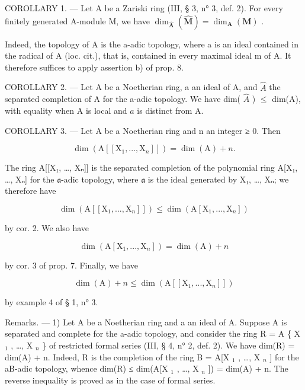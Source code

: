 COROLLARY 1. --- Let A be a Zariski ring (III, § 3, n° 3, def. 2). For every finitely generated A-module M, we have \(\dim_{\hat{\mathbf{A}}}(\hat{\mathbf{M}}) = \dim_{\mathbf{A}}(\mathbf{M})\) .

Indeed, the topology of A is the a-adic topology, where a is an ideal contained in the radical of A (loc. cit.), that is, contained in every maximal ideal m of A. It therefore suffices to apply assertion b) of prop. 8.

COROLLARY 2. --- Let A be a Noetherian ring, a an ideal of A, and \(\hat{A}\) the separated completion of A for the a-adic topology. We have dim( \(\hat{A}\) ) \(\leqslant\) dim(A), with equality when A is local and \(a\) is distinct from A.

COROLLARY 3. --- Let A be a Noetherian ring and n an integer ≥ 0. Then

\[
\dim (\mathrm{A} [ [ \mathrm{X} _ {1},..., \mathrm{X} _ {n} ] ]) = \dim (\mathrm{A}) + n.
\]

The ring A{[}{[}X₁, \ldots, Xₙ{]}{]} is the separated completion of the polynomial ring A{[}X₁, \ldots, Xₙ{]} for the \(\mathfrak{a}\)-adic topology, where \(\mathfrak{a}\) is the ideal generated by X₁, \ldots, Xₙ; we therefore have

\[
\dim (\mathrm{A} [ [ \mathrm{X} _ {1},..., \mathrm{X} _ {n} ] ]) \leqslant \dim (\mathrm{A} [ \mathrm{X} _ {1},..., \mathrm{X} _ {n} ])
\]

by cor. 2. We also have

\[
\dim (\mathrm{A} [ \mathrm{X} _ {1},..., \mathrm{X} _ {n} ]) = \dim (\mathrm{A}) + n
\]

by cor. 3 of prop. 7. Finally, we have

\[
\dim (\mathrm{A}) + n \leqslant \dim (\mathrm{A} [ [ \mathrm{X} _ {1},..., \mathrm{X} _ {n} ] ])
\]

by example 4 of § 1, n° 3.

Remarks. --- 1) Let A be a Noetherian ring and a an ideal of A. Suppose A is separated and complete for the a-adic topology, and consider the ring R = A \{ X \(_{1}\) , \ldots, X \(_{n}\) \} of restricted formal series (III, § 4, n° 2, def. 2). We have dim(R) = dim(A) + n. Indeed, R is the completion of the ring B = A{[}X \(_{1}\) , \ldots, X \(_{n}\) {]} for the aB-adic topology, whence dim(R) ≤ dim(A{[}X \(_{1}\) , \ldots, X \(_{n}\) {]}) = dim(A) + n. The reverse inequality is proved as in the case of formal series.

